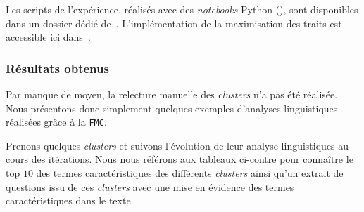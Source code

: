 			\begin{leftBarInformation}
				Les scripts de l'expérience, réalisés avec des \textit{notebooks} Python (\cite{van-rossum-drake:2009:python-reference-manual}), sont disponibles dans un dossier dédié de~\cite{schild:2021:cognitivefactory-interactiveclusteringcomparativestudy}.
				L'implémentation de la maximisation des traits est accessible ici dans~\cite{schild:2023:cognitivefactory-featuresmaximizationmetric}.
			\end{leftBarInformation}

		\subsubsection{Résultats obtenus}
			
			\begin{leftBarWarning}
				Par manque de moyen, la relecture manuelle des \textit{clusters} n'a pas été réalisée.
				Nous présentons donc simplement quelques exemples d'analyses linguistiques réalisées grâce à la \texttt{FMC}.
			\end{leftBarWarning}
			
			Prenons quelques \textit{clusters} et suivons l'évolution de leur analyse linguistiques au cours des itérations.
			Nous nous référons aux tableaux ci-contre pour connaître le top $10$ des termes caractéristiques des différents \textit{clusters} ainsi qu'un extrait de questions issu de ces \textit{clusters} avec une mise en évidence des termes caractéristiques dans le texte.
			
